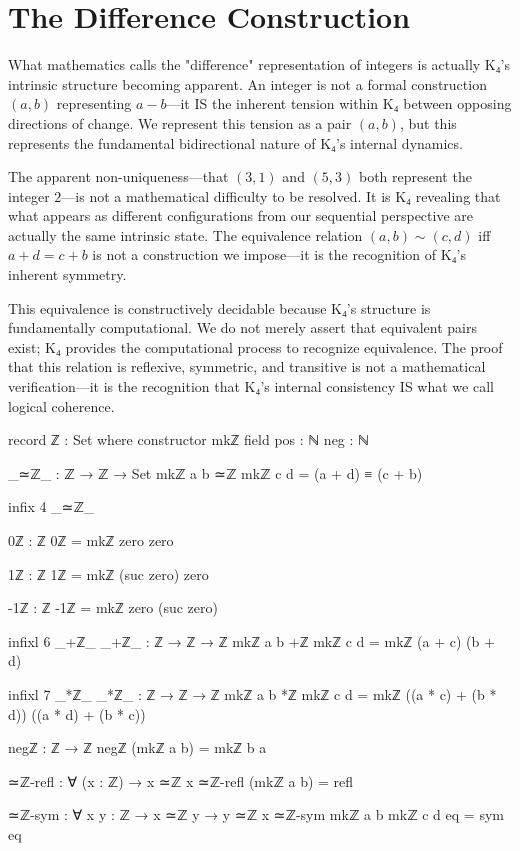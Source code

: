 \documentclass[11pt,a4paper]{book}
\begin{document}
\section{The Difference Construction}

What mathematics calls the "difference" representation of integers is actually K₄'s intrinsic structure becoming apparent. An integer is not a formal construction $(a, b)$ representing $a - b$—it IS the inherent tension within K₄ between opposing directions of change. We represent this tension as a pair $(a, b)$, but this represents the fundamental bidirectional nature of K₄'s internal dynamics.

The apparent non-uniqueness—that $(3,1)$ and $(5,3)$ both represent the integer $2$—is not a mathematical difficulty to be resolved. It is K₄ revealing that what appears as different configurations from our sequential perspective are actually the same intrinsic state. The equivalence relation $(a,b) \sim (c,d)$ iff $a + d = c + b$ is not a construction we impose—it is the recognition of K₄'s inherent symmetry.

This equivalence is constructively decidable because K₄'s structure is fundamentally computational. We do not merely assert that equivalent pairs exist; K₄ provides the computational process to recognize equivalence. The proof that this relation is reflexive, symmetric, and transitive is not a mathematical verification—it is the recognition that K₄'s internal consistency IS what we call logical coherence.

\begin{code}
record ℤ : Set where
  constructor mkℤ
  field
    pos : ℕ
    neg : ℕ

_≃ℤ_ : ℤ → ℤ → Set
mkℤ a b ≃ℤ mkℤ c d = (a + d) ≡ (c + b)

infix 4 _≃ℤ_

0ℤ : ℤ
0ℤ = mkℤ zero zero

1ℤ : ℤ
1ℤ = mkℤ (suc zero) zero

-1ℤ : ℤ
-1ℤ = mkℤ zero (suc zero)

infixl 6 _+ℤ_
_+ℤ_ : ℤ → ℤ → ℤ
mkℤ a b +ℤ mkℤ c d = mkℤ (a + c) (b + d)

infixl 7 _*ℤ_
_*ℤ_ : ℤ → ℤ → ℤ
mkℤ a b *ℤ mkℤ c d = mkℤ ((a * c) + (b * d)) ((a * d) + (b * c))

negℤ : ℤ → ℤ
negℤ (mkℤ a b) = mkℤ b a

≃ℤ-refl : ∀ (x : ℤ) → x ≃ℤ x
≃ℤ-refl (mkℤ a b) = refl

≃ℤ-sym : ∀ {x y : ℤ} → x ≃ℤ y → y ≃ℤ x
≃ℤ-sym {mkℤ a b} {mkℤ c d} eq = sym eq
\end{code}
\end{document}
